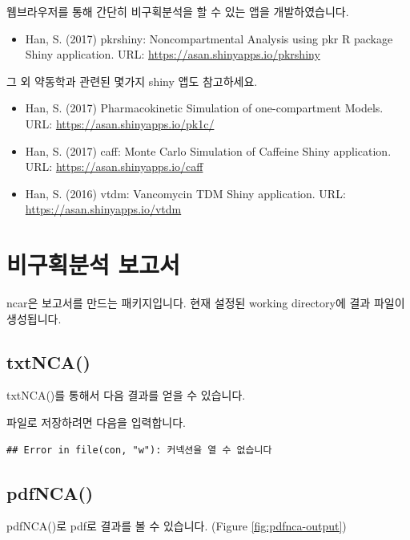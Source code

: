 \documentclass[
  11pt,
  krantz2, a4paper, twoside]{krantz}
\providecommand{\tightlist}{%
  \setlength{\itemsep}{0pt}\setlength{\parskip}{0pt}}
\begin{document}
웹브라우저를 통해 간단히 비구획분석을 할 수 있는 앱을 개발하였습니다.

\begin{itemize}
\tightlist
\item
  Han, S. (2017) pkrshiny: Noncompartmental Analysis using pkr R package Shiny application. URL: \url{https://asan.shinyapps.io/pkrshiny}
\end{itemize}

그 외 약동학과 관련된 몇가지 shiny 앱도 참고하세요.

\begin{itemize}
\tightlist
\item
  Han, S. (2017) Pharmacokinetic Simulation of one-compartment Models. URL: \url{https://asan.shinyapps.io/pk1c/}
\item
  Han, S. (2017) caff: Monte Carlo Simulation of Caffeine Shiny application. URL: \url{https://asan.shinyapps.io/caff}
\item
  Han, S. (2016) vtdm: Vancomycin TDM Shiny application. URL: \url{https://asan.shinyapps.io/vtdm}
\end{itemize}

\hypertarget{uxbe44uxad6cuxd68duxbd84uxc11d-uxbcf4uxace0uxc11c}{%
\section{비구획분석 보고서}\label{uxbe44uxad6cuxd68duxbd84uxc11d-uxbcf4uxace0uxc11c}}

ncar은 보고서를 만드는 패키지입니다. 현재 설정된 working directory에 결과 파일이 생성됩니다.

\hypertarget{txtnca}{%
\subsection{txtNCA()}\label{txtnca}}

txtNCA()를 통해서 다음 결과를 얻을 수 있습니다.

파일로 저장하려면 다음을 입력합니다.

\begin{verbatim}
## Error in file(con, "w"): 커넥션을 열 수 없습니다
\end{verbatim}

\hypertarget{pdfnca}{%
\subsection{pdfNCA()}\label{pdfnca}}

pdfNCA()로 pdf로 결과를 볼 수 있습니다. (Figure \ref{fig:pdfnca-output})
\end{document}
